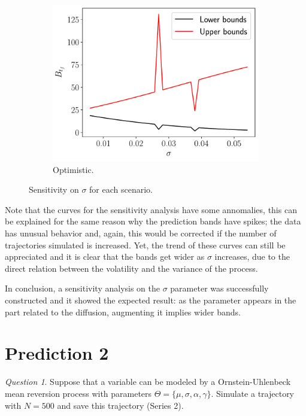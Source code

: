 \documentclass[11pt]{article}
\theoremstyle{definition}
\theoremstyle{remark}
\theoremstyle{remark}
\newtheorem{question}{Question}
\begin{document}
\begin{figure}[H]
\begin{subfigure}[b]{0.45\textwidth}
      \includegraphics[scale=0.45]{sens_optimistic.pdf}
      \caption{Optimistic.}
  \end{subfigure}
  \caption{Sensitivity on $\sigma$ for each scenario.}
  \label{fig:sens1}
\end{figure}

Note that the curves for the sensitivity analysis have some annomalies, this
can be explained for the same reason why the prediction bands have spikes; the
data has unusual behavior and, again, this would be corrected if the number of
trajectories simulated is increased. Yet, the trend of these curves can still
be appreciated and it is clear that the bands get wider as $\sigma$ increases,
due to the direct relation between the volatility and the variance of the
process.

In conclusion, a sensitivity analysis on the $\sigma$ parameter was
successfully constructed and it showed the expected result: as the parameter
appears in the part related to the diffusion, augmenting it implies wider bands.

\section*{Prediction 2}
\begin{question}
  Suppose that a variable can be modeled by a Ornstein-Uhlenbeck mean
  reversion process with parameters
  $\Theta = \{\mu, \sigma, \alpha, \gamma\}$. Simulate a trajectory
  with $N = 500$ and save this trajectory (Series 2).
\end{question}
\end{document}
